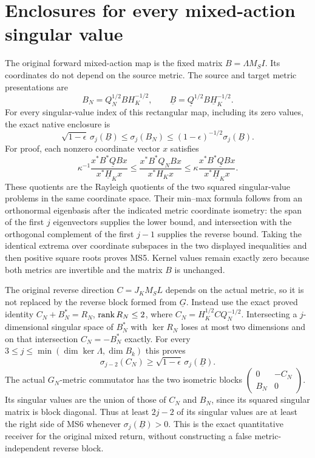 \documentclass[11pt]{article}
\begin{document}
\section{Enclosures for every mixed-action singular value}
The original forward mixed-action map is the fixed matrix
$B=\Lambda M_S I$. Its coordinates do not depend on the source
metric. The source and target metric presentations are
\[
 B_N=Q_N^{1/2}BH_K^{-1/2},\qquad
 \underline B=\underline Q^{1/2}B\underline H_K^{-1/2}.
 \tag{MS4}
\]
For every singular-value index of this rectangular map, including
its zero values, the exact native enclosure is
\[
 \boxed{\sqrt{1-\epsilon}\,\sigma_j(\underline B)
       \le\sigma_j(B_N)
       \le(1-\epsilon)^{-1/2}\sigma_j(\underline B).}
 \tag{MS5}
\]
For proof, each nonzero coordinate vector $x$ satisfies
\[
 \kappa^{-1}\frac{x^*B^*\underline QBx}{x^*\underline H_Kx}
 \le\frac{x^*B^*Q_NBx}{x^*H_Kx}
 \le\kappa\frac{x^*B^*\underline QBx}{x^*\underline H_Kx}.
\]
These quotients are the Rayleigh quotients of the two squared
singular-value problems in the same coordinate space. Their
min--max formula follows from an orthonormal eigenbasis after
the indicated metric coordinate isometry: the span of the first
$j$ eigenvectors supplies the lower bound, and intersection with
the orthogonal complement of the first $j-1$ supplies the reverse
bound. Taking the identical extrema over coordinate subspaces
in the two displayed inequalities and then positive square roots
proves MS5. Kernel values remain exactly zero because both metrics
are invertible and the matrix $B$ is unchanged.

The original reverse direction $C=J_KM_SL$ depends on the actual
metric, so it is not replaced by the reverse block formed from
$\underline G$. Instead use the exact proved identity
$C_N+B_N^*=R_N$, $\operatorname{rank} R_N\le2$, where
$C_N=H_K^{1/2}CQ_N^{-1/2}$. Intersecting a $j$-dimensional
singular space of $B_N^*$ with $\ker R_N$ loses at most two
dimensions and on that intersection $C_N=-B_N^*$ exactly.
For every $3\le j\le\min(\dim\ker\Lambda,\dim B_k)$ this proves
\[
 \boxed{\sigma_{j-2}(C_N)
          \ge\sqrt{1-\epsilon}\,\sigma_j(\underline B).}
 \tag{MS6}
\]
The actual $G_N$-metric commutator has the two isometric blocks
$\left(\begin{smallmatrix}0&-C_N\\B_N&0\end{smallmatrix}\right)$.
Its singular values are the union of those of $C_N$ and $B_N$,
since its squared singular matrix is block diagonal. Thus at
least $2j-2$ of its singular values are at least the right side
of MS6 whenever $\sigma_j(\underline B)>0$. This is the exact
quantitative receiver for the original mixed return, without
constructing a false metric-independent reverse block.
\end{document}
